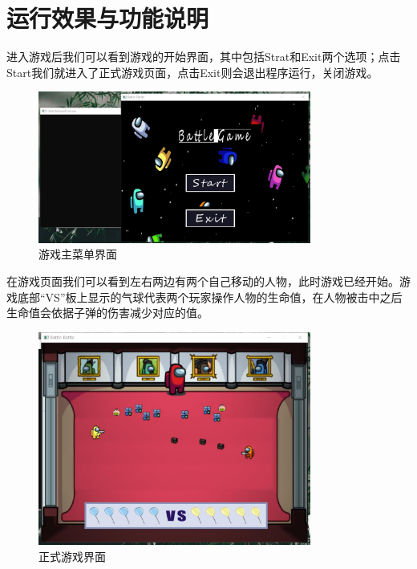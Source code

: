 \section{运行效果与功能说明}
进入游戏后我们可以看到游戏的开始界面，其中包括Strat和Exit两个选项；点击Start我们就进入了正式游戏页面，点击Exit则会退出程序运行，关闭游戏。
\par
\begin{figure}[htbp]
    \vspace{13pt} %
    \centering
    \includegraphics[width=0.8\textwidth]{images/4-10.jpg}
    \caption{游戏主菜单界面}%
\end{figure}
\par
在游戏页面我们可以看到左右两边有两个自己移动的人物，此时游戏已经开始。游戏底部“VS”板上显示的气球代表两个玩家操作人物的生命值，在人物被击中之后生命值会依据子弹的伤害减少对应的值。
\par
\begin{figure}[htbp]
    \vspace{13pt} %
    \centering
    \includegraphics[width=0.8\textwidth]{images/4-11.jpg}
    \caption{正式游戏界面}%
\end{figure}

